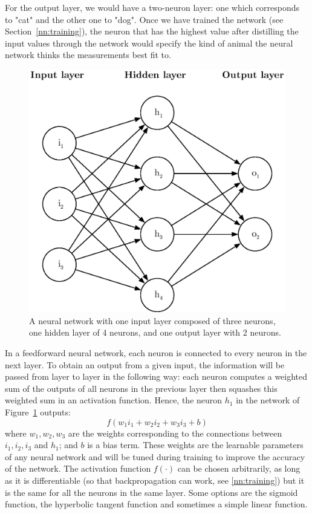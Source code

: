 For the output layer, we would have a two-neuron layer: one which corresponds
to "cat" and the other one to "dog". Once we have trained the network
(see Section~\ref{nn:training}), the neuron that has the highest value
after distilling the input values through the network would specify the
kind of animal the neural network thinks the measurements best fit to.\\

\begin{figure}[]
	\centering
	\includegraphics[width=0.6\linewidth]{fig/neural_network.eps}
	\caption{A neural network with one input layer composed of three neurons,
	one hidden layer of 4 neurons, and one output layer with 2 neurons.}
	\label{fig:neural_network}
\end{figure}


In a feedforward neural network, each neuron is connected to every neuron in 
the next layer.  To obtain an output from a given input,
the information will be passed from layer to layer in the following way: 
each neuron computes a weighted sum of the outputs of all neurons in the
previous layer then squashes this weighted sum in an activation function.
Hence, the neuron $h_1$ in the network of Figure~\ref{fig:neural_network}
outputs:
$$ f(w_1i_1 + w_2i_2 + w_3i_3 + b) $$
where $w_1, w_2, w_3$ are the weights  corresponding to the
connections between $i_1, i_2, i_3$ and $h_1$; and $b$ is a bias term. 
These weights are the learnable parameters of any neural network and will be 
tuned during training to improve the accuracy of the network. 
The activation function $f(\cdot)$ can be chosen arbitrarily, as long as it 
is differentiable (so that backpropagation can work, see \ref{nn:training})
but it is the same for all the neurons in the same layer. Some options are
the sigmoid function, the hyperbolic tangent function and sometimes a simple
linear function.\\

